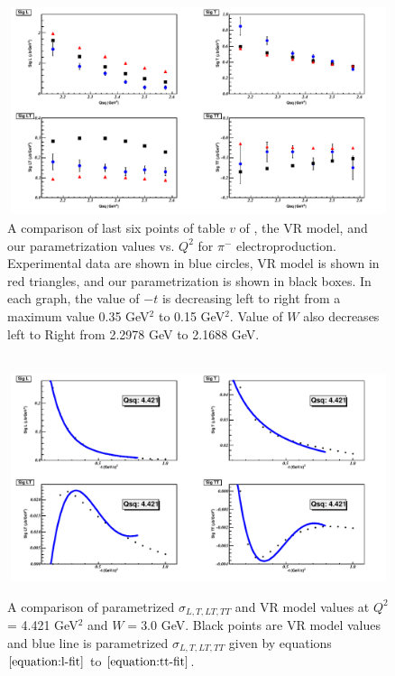 \begin{figure}[!hbt]
    \centering
    \includegraphics[width=6.0in,height=2.4in]{./figures/pimsigma_qsq.pdf}
    \caption{ A comparison of last six points of table $v$ of \cite{gmhuber-2},
      the VR model, and our parametrization values vs. $Q^{2}$ for $\pi^{-}$
      electroproduction. Experimental data are shown in blue circles, VR model
      is shown in red triangles, and our parametrization is shown in black
      boxes. In each graph, the value of $-t$ is decreasing left to right from
      a maximum value 0.35 GeV$^2$ to 0.15 GeV$^2$. Value of $W$ also decreases
      left to Right from 2.2978 GeV to 2.1688 GeV.}
    \label{fig:expvrfit}
\end{figure}

\begin{figure}[!hbt]
    \centering
\    \includegraphics[width=6.0in,height=2.4in]{./figures/pimFit.pdf}
    \caption{ A comparison of parametrized $\sigma_{L,T,LT,TT}$ and VR model
    values at $Q^2$ = 4.421 GeV$^2$ and $W = 3.0$ GeV.  Black points are VR
    model values and blue line is parametrized $\sigma_{L,T,LT,TT}$ given by
    equations $\ref{equation:l-fit}$ to $\ref{equation:tt-fit}$. }
    \label{fig:sigall}
\end{figure}

